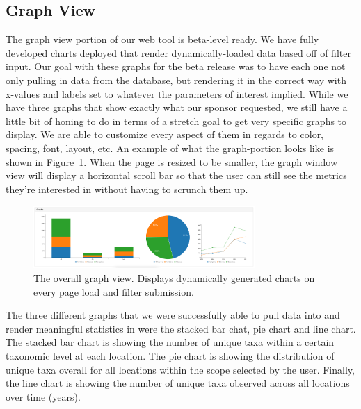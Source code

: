 \documentclass[10pt,draftclsnofoot,onecolumn]{IEEEtran}
\begin{document}
\subsection{Graph View} %
The graph view portion of our web tool is beta-level ready.
We have fully developed charts deployed that render dynamically-loaded data based off of filter input.
Our goal with these graphs for the beta release was to have each one not only pulling in data from the database, but rendering it in the correct way with x-values and labels set to whatever the parameters of interest implied.
While we have three graphs that show exactly what our sponsor requested, we still have a little bit of honing to do in terms of a stretch goal to get very specific graphs to display.
We are able to customize every aspect of them in regards to color, spacing, font, layout, etc.
An example of what the graph-portion looks like is shown in Figure~\ref{fig:graph_view}.
When the page is resized to be smaller, the graph window view will display a horizontal scroll bar so that the user can still see the metrics they’re interested in without having to scrunch them up.

\begin{figure}[h]
\centering
\includegraphics[width=0.75\textwidth]{images/graph_view.jpg}
\captionsetup{justification=centering}
\caption{
  The overall graph view.
  Displays dynamically generated charts on every page load and filter submission.
}
\label{fig:graph_view}
\end{figure}

The three different graphs that we were successfully able to pull data into and render meaningful statistics in were the stacked bar chat, pie chart and line chart.
The stacked bar chart is showing the number of unique taxa within a certain taxonomic level at each location.
The pie chart is showing the distribution of unique taxa overall for all locations within the scope selected by the user.
Finally, the line chart is showing the number of unique taxa observed across all locations over time (years).
\end{document}
